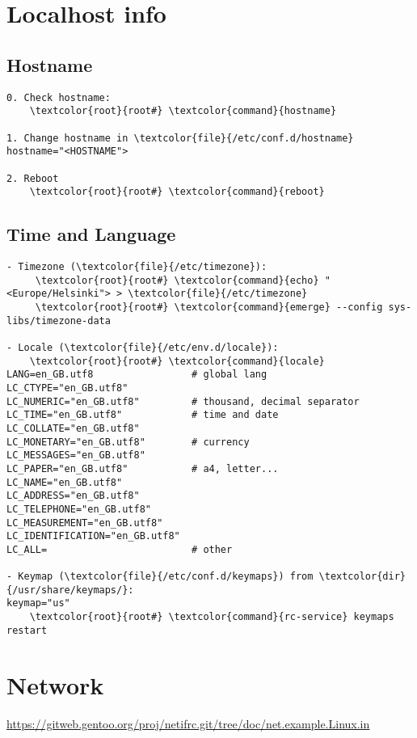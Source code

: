 \documentclass[10pt, a4paper, onecolumn, openany]{book}         %
\begin{document}
\section{Localhost info}
\subsection{Hostname}
\begin{Verbatim}[commandchars=\\\{\}]
0. Check hostname:
    \textcolor{root}{root#} \textcolor{command}{hostname}
    
1. Change hostname in \textcolor{file}{/etc/conf.d/hostname}
hostname="<HOSTNAME">

2. Reboot
    \textcolor{root}{root#} \textcolor{command}{reboot}
\end{Verbatim}

\subsection{Time and Language}
\begin{Verbatim}[commandchars=\\\{\}]
- Timezone (\textcolor{file}{/etc/timezone}):
     \textcolor{root}{root#} \textcolor{command}{echo} "<Europe/Helsinki"> > \textcolor{file}{/etc/timezone}
     \textcolor{root}{root#} \textcolor{command}{emerge} --config sys-libs/timezone-data

- Locale (\textcolor{file}{/etc/env.d/locale}):
    \textcolor{root}{root#} \textcolor{command}{locale}
LANG=en_GB.utf8                 # global lang
LC_CTYPE="en_GB.utf8"           
LC_NUMERIC="en_GB.utf8"         # thousand, decimal separator
LC_TIME="en_GB.utf8"            # time and date
LC_COLLATE="en_GB.utf8"
LC_MONETARY="en_GB.utf8"        # currency
LC_MESSAGES="en_GB.utf8"
LC_PAPER="en_GB.utf8"           # a4, letter...
LC_NAME="en_GB.utf8"
LC_ADDRESS="en_GB.utf8"
LC_TELEPHONE="en_GB.utf8"
LC_MEASUREMENT="en_GB.utf8"
LC_IDENTIFICATION="en_GB.utf8"  
LC_ALL=                         # other

- Keymap (\textcolor{file}{/etc/conf.d/keymaps}) from \textcolor{dir}{/usr/share/keymaps/}:
keymap="us"
    \textcolor{root}{root#} \textcolor{command}{rc-service} keymaps restart
\end{Verbatim}

\section{Network}
\underline{\url{https://gitweb.gentoo.org/proj/netifrc.git/tree/doc/net.example.Linux.in}}
\end{document}
